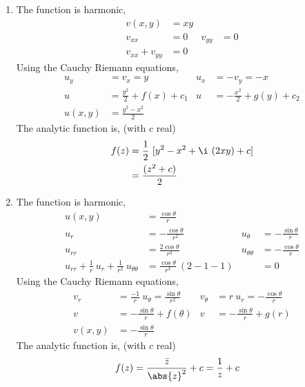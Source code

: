 \begin{enumerate}
    \item The function is \textcolor{y_h}{harmonic},
          \begin{align}
              v(x, y)         & = xy   \\
              v_{xx}          & = 0  &
              v_{yy}          & = 0    \\
              v_{xx} + v_{yy} & = 0
          \end{align}
          Using the Cauchy Riemann equations,
          \begin{align}
              u_y     & = v_x = y                     &
              u_x     & = -v_y = -x                     \\
              u       & = \frac{y^2}{2} + f(x) + c_1  &
              u       & = -\frac{x^2}{2} + g(y) + c_2   \\
              u(x, y) & = \frac{y^2 - x^2}{2}
          \end{align}
          The analytic function is, (with $ c $ real)
          \begin{align}
              f(z) & = \frac{1}{2}\ [y^2 - x^2 + \i\ (2xy) + c] \\
                   & = \frac{(z^2 + c)}{2}
          \end{align}

    \item The function is \textcolor{y_h}{harmonic},
          \begin{align}
              u(x, y)                           & = \frac{\cos\theta}{r}      \\
              u_{r}                             & = -\frac{\cos\theta}{r^2} &
              u_{\theta}                        & = -\frac{\sin\theta}{r}     \\
              u_{rr}                            & = \frac{2\cos\theta}{r^3} &
              u_{\theta\theta}                  & = -\frac{\cos\theta}{r}     \\
              u_{rr} + \frac{1}{r}\ u_{r}
              + \frac{1}{r^2}\ u_{\theta\theta} & = \frac{\cos\theta}{r^3}
              \ (2 - 1 - 1)                     &
                                                & = 0
          \end{align}
          Using the Cauchy Riemann equations,
          \begin{align}
              v_r      & = \frac{-1}{r}\ u_\theta = \frac{\sin\theta}{r^2} &
              v_\theta & = r\ u_r = -\frac{\cos\theta}{r}                    \\
              v        & = -\frac{\sin\theta}{r} + f(\theta)               &
              v        & = -\frac{\sin\theta}{r} + g(r)                      \\
              v(x, y)  & = -\frac{\sin\theta}{r}
          \end{align}
          The analytic function is, (with $ c $ real)
          \begin{align}
              f(z) & = \frac{\bar{z}}{\abs{z}^2} + c = \frac{1}{z} + c
          \end{align}


\end{enumerate}
